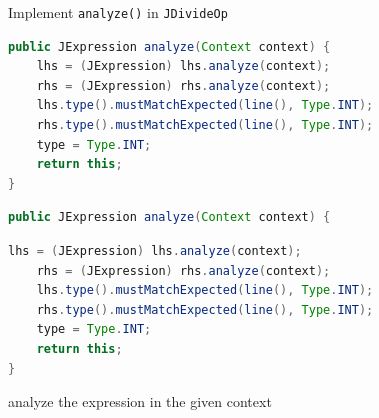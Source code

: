\documentclass[8pt,a4paper,compress]{beamer}
\begin{document}
\begin{frame}[fragile]
\pause

Implement \lstinline{analyze()} in \lstinline{JDivideOp}

\smallskip

\begin{overprint}
\begin{tcolorbox}[enhanced,drop shadow southwest,sharp corners,size=fbox,colback=white,fontlower=\small\ttfamily,collower=silver900]

\begin{lstlisting}[language=Java,style=focusin]
public JExpression analyze(Context context) {
    lhs = (JExpression) lhs.analyze(context);
    rhs = (JExpression) rhs.analyze(context);
    lhs.type().mustMatchExpected(line(), Type.INT);
    rhs.type().mustMatchExpected(line(), Type.INT);
    type = Type.INT;
    return this;
}
\end{lstlisting}

\tcblower
\begin{minipage}[t][.25cm][t]{\textwidth}

\end{minipage}
\end{tcolorbox}

\begin{tcolorbox}[enhanced,drop shadow southwest,sharp corners,size=fbox,colback=white,fontlower=\small\ttfamily,collower=silver900]

\begin{lstlisting}[language=Java,style=focusin,backgroundcolor=\color{lime100}]
public JExpression analyze(Context context) {
\end{lstlisting}
\begin{lstlisting}[language=Java,style=focusout]
    lhs = (JExpression) lhs.analyze(context);
    rhs = (JExpression) rhs.analyze(context);
    lhs.type().mustMatchExpected(line(), Type.INT);
    rhs.type().mustMatchExpected(line(), Type.INT);
    type = Type.INT;
    return this;
}
\end{lstlisting}

\tcblower
\begin{minipage}[t][.25cm][t]{\textwidth}
analyze the expression in the given context
\end{minipage}
\end{tcolorbox}

\begin{tcolorbox}[enhanced,drop shadow southwest,sharp corners,size=fbox,colback=white,fontlower=\small\ttfamily,collower=silver900]


\end{tcolorbox}
\end{overprint}
\end{frame}
\end{document}
